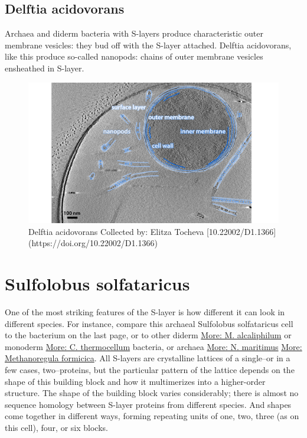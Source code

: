 \documentclass[]{tufte-book}
\begin{document}
\hypertarget{Nanopods}{\subsection{Delftia acidovorans}\label{Nanopods}}

Archaea and diderm bacteria with S-layers produce characteristic outer
membrane vesicles: they bud off with the S-layer attached. Delftia
acidovorans, like this produce so-called nanopods: chains of outer
membrane vesicles ensheathed in S-layer.

\begin{figure}
\includegraphics{img/2_6a_Dacidovorans} \caption[Delftia acidovorans Collected by]{Delftia acidovorans Collected by: Elitza Tocheva [10.22002/D1.1366](https://doi.org/10.22002/D1.1366)}\label{fig:unnamed-chunk-19}
\end{figure}

\section{Sulfolobus solfataricus}\label{sulfolobus-solfataricus}

One of the most striking features of the S-layer is how different it can
look in different species. For instance, compare this archaeal
Sulfolobus solfataricus cell to the bacterium on the last page, or to
other diderm \protect\hyperlink{M._alcaliphilum}{More: M. alcaliphilum}
or monoderm \protect\hyperlink{}{More: C. thermocellum} bacteria, or
archaea \protect\hyperlink{N._maritimus}{More: N. maritimus}
\protect\hyperlink{Methanoregula_formicica}{More: Methanoregula
formicica}. All S-layers are crystalline lattices of a single--or in a
few cases, two--proteins, but the particular pattern of the lattice
depends on the shape of this building block and how it multimerizes into
a higher-order structure. The shape of the building block varies
considerably; there is almost no sequence homology between S-layer
proteins from different species. And shapes come together in different
ways, forming repeating units of one, two, three (as on this cell),
four, or six blocks.
\end{document}
